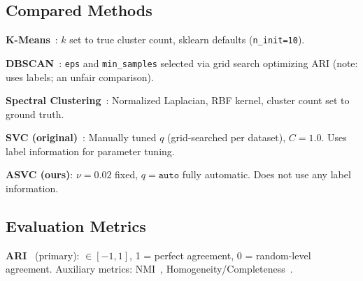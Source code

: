 \subsection{Compared Methods}

\textbf{K-Means}~\cite{macqueen1967}: $k$ set to true cluster count, sklearn defaults (\texttt{n\_init=10}).

\textbf{DBSCAN}~\cite{ester1996}: \texttt{eps} and \texttt{min\_samples} selected via grid search optimizing ARI (note: uses labels; an unfair comparison).

\textbf{Spectral Clustering}~\cite{ng2002}: Normalized Laplacian, RBF kernel, cluster count set to ground truth.

\textbf{SVC (original)}~\cite{benhur2001}: Manually tuned $q$ (grid-searched per dataset), $C\!=\!1.0$. Uses label information for parameter tuning.

\textbf{ASVC (ours)}: $\nu\!=\!0.02$ fixed, $q\!=\!\texttt{auto}$ fully automatic. Does not use any label information.

\subsection{Evaluation Metrics}

\textbf{ARI}~\cite{hubert1985} (primary): $\in[-1,1]$, 1 = perfect agreement, 0 = random-level agreement. Auxiliary metrics: NMI~\cite{strehl2002}, Homogeneity/Completeness~\cite{rosenberg2007}.
